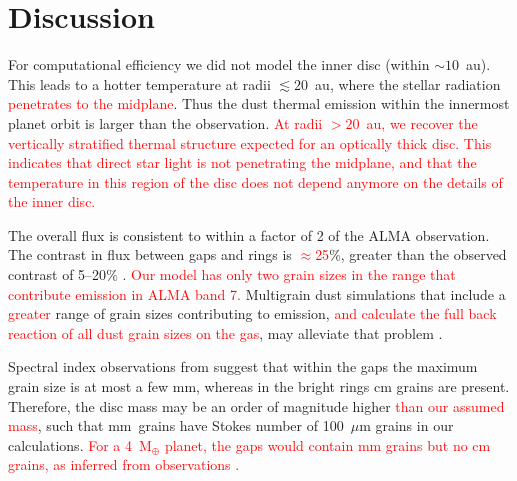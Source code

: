 \documentclass[usenatbib,a4paper,times]{mnras}
\renewcommand{\earth}{\mathrm{M}_{\oplus}}
\newcommand{\new}[1]{{\textcolor{red}{#1}}}
\begin{document}
\section{Discussion}
\label{sec:discussion}

For computational efficiency we did not model the inner disc (within
$\sim10$~au). This leads to a hotter temperature at radii $\lesssim 20$~au,
where the stellar radiation \new{penetrates to the midplane}. Thus the dust
thermal emission within the innermost planet orbit is larger than the
observation. \new{At radii $>20$~au, we recover the vertically stratified
thermal structure expected for an optically thick disc. This indicates that
direct star light is not penetrating the midplane, and that the temperature in
this region of the disc does not depend anymore on the details of the inner
disc.}

The overall flux is consistent to within a factor of 2 of the ALMA observation.
The contrast in flux between gaps and rings is \new{$\approx$25}\%, greater than
the observed contrast of 5--20$\%$ \citep{andrews:2016}. \new{Our model has only
two grain sizes in the range that contribute emission in ALMA band 7.}
Multigrain dust simulations that include a \new{greater} range of grain sizes
contributing to emission, \new{and calculate the full back reaction of all dust
grain sizes on the gas}, may alleviate that problem \citep{hutchison:2018}.

Spectral index observations from \citet{huang:2018} suggest that within the gaps
the maximum grain size is at most a few mm, whereas in the bright rings cm
grains are present. Therefore, the disc mass may be an order of magnitude higher
\new{than our assumed mass}, such that mm~grains have Stokes number of
100~$\mu$m grains in our calculations. \new{For a 4~$\earth{}$ planet, the gaps
would contain mm grains but no cm grains, as inferred from observations
\citep{huang:2018}.}
\end{document}
